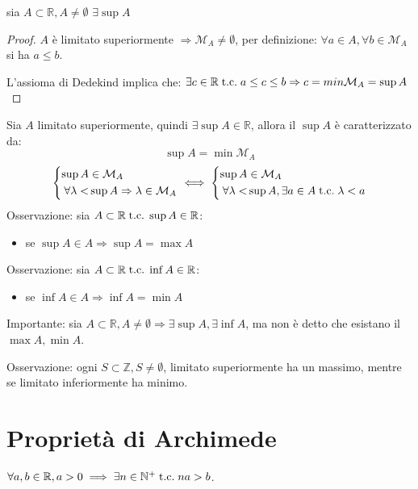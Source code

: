 \documentclass[a4paper, 12pt, openany]{book}
\begin{document}
	\newpage
	
	\begin{proposition}
		sia $A \subset \mathbb{R}, A \not = \emptyset$ $\exists \sup A$
	\end{proposition}
	
	\begin{proof}
		$A $ è limitato superiormente $\Rightarrow \mathcal{M}_A \not = \emptyset$, per definizione: $\forall a \in A,\forall b \in \mathcal{M}_A$ si ha $a \leq b$.
		
		L'assioma di Dedekind implica che: $\exists c \in \mathbb{R} \;\text{t.c.}\; a \leq c \leq b \Rightarrow c = min \mathcal{M}_A = \sup A$
	\end{proof}
	Sia $A$ limitato superiormente, quindi $\exists \sup A \in \mathbb{R}$, allora il $\sup A$ è caratterizzato da:
	\[\sup A = \min \mathcal{M}_A\]
	\[
	\left\{
	\begin{aligned}
		\sup A &\in \mathcal{M}_A \\
		\forall \lambda < &\sup A \Rightarrow \lambda\in \mathcal{M}_A
	\end{aligned}
	\right. \iff \left\{
	\begin{aligned}
	\sup A &\in \mathcal{M}_A \\
	\forall \lambda < &\sup A, \exists a \in A \;\text{t.c.}\; \lambda < a
	\end{aligned}\right.
	\]
	Osservazione:
	sia $A \subset \mathbb{R} \;\text{t.c.}\; \sup A \in \mathbb{R}$:
	\begin{itemize}
		\item se $\sup A \in A \Rightarrow \sup A = \max A$
	\end{itemize}
	Osservazione: sia $A \subset \mathbb{R} \;\text{t.c.}\; \inf A \in \mathbb{R}$:
	\begin{itemize}
	\item se $\inf A \in A \Rightarrow \inf A = \min A$
	\end{itemize}	
	Importante:
	sia $A \subset \mathbb{R}, A \not = \emptyset \Rightarrow \exists \sup A, \exists \inf A $, ma non è detto che esistano il $\max A, \min A$.
	
	Osservazione:
	ogni $S \subset \mathbb{Z}, S \not = \emptyset$, limitato superiormente ha un massimo, mentre se limitato inferiormente ha minimo.
	
	\section{Proprietà di Archimede}
	$\forall a, b \in \mathbb{R}, a > 0 \implies \exists n \in \mathbb{N}^+ \;\text{t.c.}\; na > b$.
	
\end{document}
